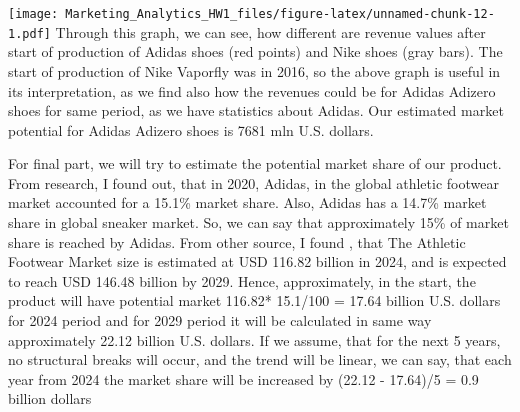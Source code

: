 \documentclass[
]{article}
\begin{document}
\texttt{[image: Marketing\_Analytics\_HW1\_files/figure-latex/unnamed-chunk-12-1.pdf]}
Through this graph, we can see, how different are revenue values after
start of production of Adidas shoes (red points) and Nike shoes (gray
bars). The start of production of Nike Vaporfly was in 2016, so the
above graph is useful in its interpretation, as we find also how the
revenues could be for Adidas Adizero shoes for same period, as we have
statistics about Adidas. Our estimated market potential for Adidas
Adizero shoes is 7681 mln U.S. dollars.

For final part, we will try to estimate the potential market share of
our product. From research, I found out, that in 2020, Adidas, in the
global athletic footwear market accounted for a 15.1\% market share.
Also, Adidas has a 14.7\% market share in global sneaker market. So, we
can say that approximately 15\% of market share is reached by Adidas.
From other source, I found , that The Athletic Footwear Market size is
estimated at USD 116.82 billion in 2024, and is expected to reach USD
146.48 billion by 2029. Hence, approximately, in the start, the product
will have potential market 116.82* 15.1/100 = 17.64 billion U.S. dollars
for 2024 period and for 2029 period it will be calculated in same way
approximately 22.12 billion U.S. dollars. If we assume, that for the
next 5 years, no structural breaks will occur, and the trend will be
linear, we can say, that each year from 2024 the market share will be
increased by (22.12 - 17.64)/5 = 0.9 billion dollars
\end{document}
